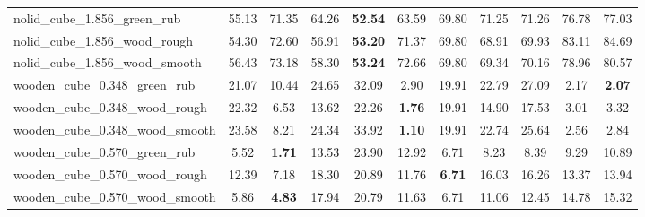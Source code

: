 \begin{table}[H]
{\begin{tabular}{l cccccccccc}
        nolid\_cube\_1.856\_green\_rub & 55.13 & 71.35 & 64.26 & \textbf{52.54} & 63.59 & 69.80 & 71.25 & 71.26 & 76.78 & 77.03 \\
        nolid\_cube\_1.856\_wood\_rough & 54.30 & 72.60 & 56.91 & \textbf{53.20} & 71.37 & 69.80 & 68.91 & 69.93 & 83.11 & 84.69 \\
        nolid\_cube\_1.856\_wood\_smooth & 56.43 & 73.18 & 58.30 & \textbf{53.24} & 72.66 & 69.80 & 69.34 & 70.16 & 78.96 & 80.57 \\
        wooden\_cube\_0.348\_green\_rub & 21.07 & 10.44 & 24.65 & 32.09 & 2.90 & 19.91 & 22.79 & 27.09 & 2.17 & \textbf{2.07} \\
        wooden\_cube\_0.348\_wood\_rough & 22.32 & 6.53 & 13.62 & 22.26 & \textbf{1.76} & 19.91 & 14.90 & 17.53 & 3.01 & 3.32 \\
        wooden\_cube\_0.348\_wood\_smooth & 23.58 & 8.21 & 24.34 & 33.92 & \textbf{1.10} & 19.91 & 22.74 & 25.64 & 2.56 & 2.84 \\
        wooden\_cube\_0.570\_green\_rub & 5.52 & \textbf{1.71} & 13.53 & 23.90 & 12.92 & 6.71 & 8.23 & 8.39 & 9.29 & 10.89 \\
        wooden\_cube\_0.570\_wood\_rough & 12.39 & 7.18 & 18.30 & 20.89 & 11.76 & \textbf{6.71} & 16.03 & 16.26 & 13.37 & 13.94 \\
        wooden\_cube\_0.570\_wood\_smooth & 5.86 & \textbf{4.83} & 17.94 & 20.79 & 11.63 & 6.71 & 11.06 & 12.45 & 14.78 & 15.32 \\
        \bottomrule
    \end{tabular}
    }
\end{table}



\vspace{1cm}

\clearpage

